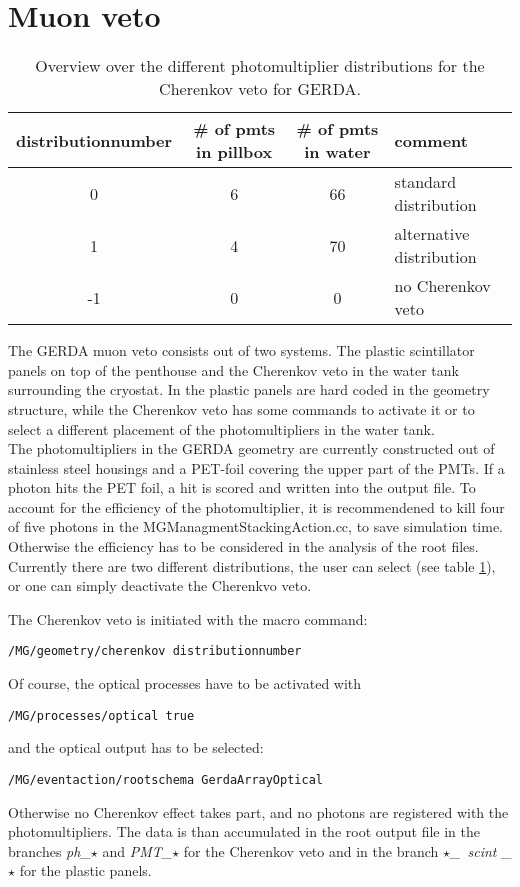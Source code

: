 \section{Muon veto}
\begin{table}[ht]
 \caption{Overview over the different photomultiplier distributions for the Cherenkov veto for GERDA. \label{Table:pmt_dist}}
 \begin{center}
  \begin{tabular}{|c|c|c|l|}
   \hline
   distributionnumber  & \# of pmts in pillbox & \# of pmts in water & comment \\ \hline \hline
   0                   &                     6 &                  66 & standard distribution \\ \hline
   1                   &                     4 & 70                  & alternative distribution \\ \hline
   -1                  &                     0 &                   0 & no Cherenkov veto \\ \hline
  \end{tabular}
 \end{center}
\end{table}
The GERDA muon veto consists out of two systems. The plastic scintillator panels on top of the penthouse 
and the Cherenkov veto in the water tank surrounding the cryostat. In \mage the plastic panels are hard
coded in the geometry structure, while the Cherenkov veto has some commands to activate it or to select a
different placement of the photomultipliers in the water tank. \\
The photomultipliers in the GERDA geometry are currently constructed out of stainless steel housings and a PET-foil 
covering the upper part of the PMTs. If a photon hits the PET foil, a hit is scored and written into the output file. 
To account for the efficiency of the photomultiplier, it is recommendened to kill four of five photons in the MGManagmentStackingAction.cc, to save simulation time. Otherwise the efficiency has to be considered in the analysis 
of the root files. \\
Currently there are two different distributions, the user can select (see table \ref{Table:pmt_dist}), or one
can simply deactivate the Cherenkvo veto. 

The Cherenkov veto is initiated with the macro command:
\begin{lstlisting}
/MG/geometry/cherenkov distributionnumber
\end{lstlisting}
Of course, the optical processes have to be activated with
\begin{lstlisting}
/MG/processes/optical true
\end{lstlisting}
and the optical output has to be selected:
\begin{lstlisting}
/MG/eventaction/rootschema GerdaArrayOptical
\end{lstlisting}
Otherwise no Cherenkov effect takes part, and no photons are registered with the photomultipliers.
The data is than accumulated in the root output file in the branches \textit{ph\_$\star$} and 
\textit{PMT\_$\star$} for the Cherenkov veto and in the branch \textit{$\star$\_\ scint \_$\star$} for
the plastic panels.


